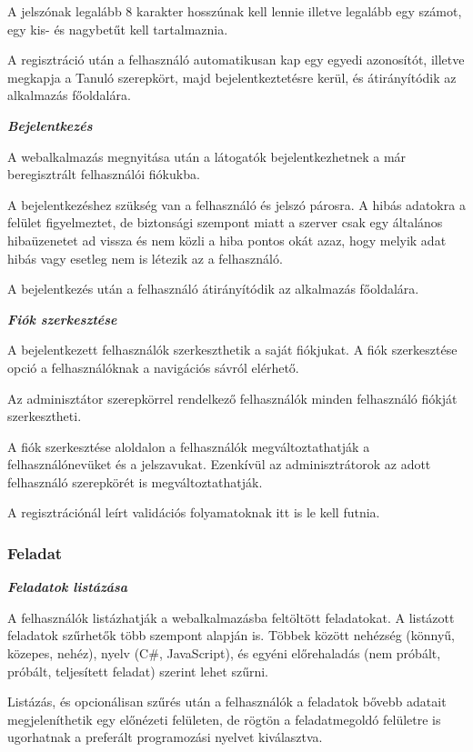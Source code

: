 A jelszónak legalább 8 karakter hosszúnak kell lennie illetve legalább egy számot, egy kis- és nagybetűt kell tartalmaznia.

A regisztráció után a felhasználó automatikusan kap egy egyedi azonosítót, illetve megkapja a Tanuló szerepkört, majd bejelentkeztetésre kerül, és átirányítódik az alkalmazás főoldalára.

\textbf{\textit{Bejelentkezés}}

A webalkalmazás megnyitása után a látogatók bejelentkezhetnek a már beregisztrált felhasználói fiókukba.

A bejelentkezéshez szükség van a felhasználó és jelszó párosra. A hibás adatokra a felület figyelmeztet, de biztonsági szempont miatt a szerver csak egy általános hibaüzenetet ad vissza és nem közli a hiba pontos okát azaz, hogy melyik adat hibás vagy esetleg nem is létezik az a felhasználó.

A bejelentkezés után a felhasználó átirányítódik az alkalmazás főoldalára.

\textbf{\textit{Fiók szerkesztése}}

A bejelentkezett felhasználók szerkeszthetik a saját fiókjukat. A fiók szerkesztése opció a felhasználóknak a navigációs sávról elérhető.

Az adminisztátor szerepkörrel rendelkező felhasználók minden felhasználó fiókját szerkesztheti. 

A fiók szerkesztése aloldalon a felhasználók megváltoztathatják a felhasználónevüket és a jelszavukat. Ezenkívül az adminisztrátorok az adott felhasználó szerepkörét is megváltoztathatják.

A regisztrációnál leírt validációs folyamatoknak itt is le kell futnia.

\subsubsection{Feladat}

\textbf{\textit{Feladatok listázása}}

A felhasználók listázhatják a webalkalmazásba feltöltött feladatokat. A listázott feladatok szűrhetők több szempont alapján is. Többek között nehézség (könnyű, közepes, nehéz), nyelv (C\#, JavaScript), és egyéni előrehaladás (nem próbált, próbált, teljesített feladat) szerint lehet szűrni.

Listázás, és opcionálisan szűrés után a felhasználók a feladatok bővebb adatait megjeleníthetik egy előnézeti felületen, de rögtön a feladatmegoldó felületre is ugorhatnak a preferált programozási nyelvet kiválasztva.

